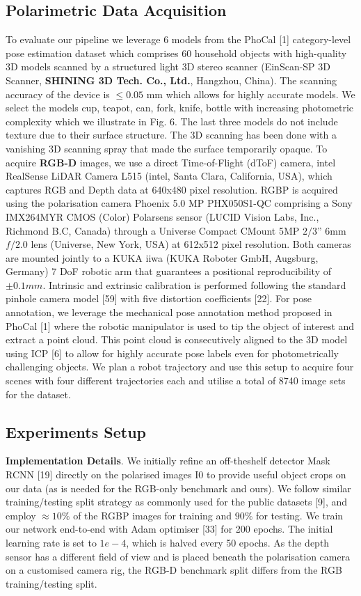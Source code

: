 \documentclass[10pt,twocolumn,letterpaper]{article}
\begin{document}
\subsection{Polarimetric Data Acquisition}
    To evaluate our pipeline we leverage 6 models from the
PhoCal [1] category-level pose estimation dataset which
comprises 60 household objects with high-quality 3D
models scanned by a structured light 3D stereo scanner
(EinScan-SP 3D Scanner, \textbf{SHINING 3D Tech. Co., Ltd.},
Hangzhou, China). The scanning accuracy of the device is
$\leq 0.05$ mm which allows for highly accurate models. We
select the models cup, teapot, can, fork, knife, bottle with
increasing photometric complexity which we illustrate in
Fig. 6. The last three models do not include texture due to
their surface structure. The 3D scanning has been done with
a vanishing 3D scanning spray that made the surface temporarily opaque. To acquire \textbf{RGB-D} images, we use a direct Time-of-Flight (dToF) camera, intel RealSense LiDAR Camera L515 (intel, Santa Clara, California, USA), which
captures RGB and Depth data at 640x480 pixel resolution.
RGBP is acquired using the polarisation camera Phoenix
5.0 MP PHX050S1-QC comprising a Sony IMX264MYR CMOS (Color) Polarsens sensor (LUCID Vision Labs, Inc., Richmond B.C, Canada) through a Universe Compact CMount 5MP $2/3”$ 6mm $f/2.0$ lens (Universe, New York, USA) at 612x512 pixel resolution. Both cameras are mounted jointly to a KUKA iiwa (KUKA Roboter GmbH,
Augsburg, Germany) 7 DoF robotic arm that guarantees a positional reproducibility of $\pm0.1 mm$. Intrinsic and extrinsic calibration is performed following the standard pinhole camera model [59] with five distortion coefficients [22]. For
pose annotation, we leverage the mechanical pose annotation method proposed in PhoCal [1] where the robotic manipulator is used to tip the object of interest and extract a point cloud. This point cloud is consecutively aligned to
the 3D model using ICP [6] to allow for highly accurate pose labels even for photometrically challenging objects. We plan a robot trajectory and use this setup to acquire four scenes with four different trajectories each and utilise a total of 8740 image sets for the dataset.
\subsection{Experiments Setup}
\textbf{Implementation Details}. We initially refine an off-theshelf detector Mask RCNN [19] directly on the polarised images I0 to provide useful object crops on our data (as is needed for the RGB-only benchmark and ours). We follow
similar training/testing split strategy as commonly used for the public datasets [9], and employ $≈ 10\%$ of the RGBP images for training and $90\%$ for testing. We train our network end-to-end with Adam optimiser [33] for 200 epochs.
The initial learning rate is set to $1e-4$, which is halved every 50 epochs. As the depth sensor has a different field of view and is placed beneath the polarisation camera on a customised camera rig, the RGB-D benchmark split differs
from the RGB training/testing split.
\end{document}
